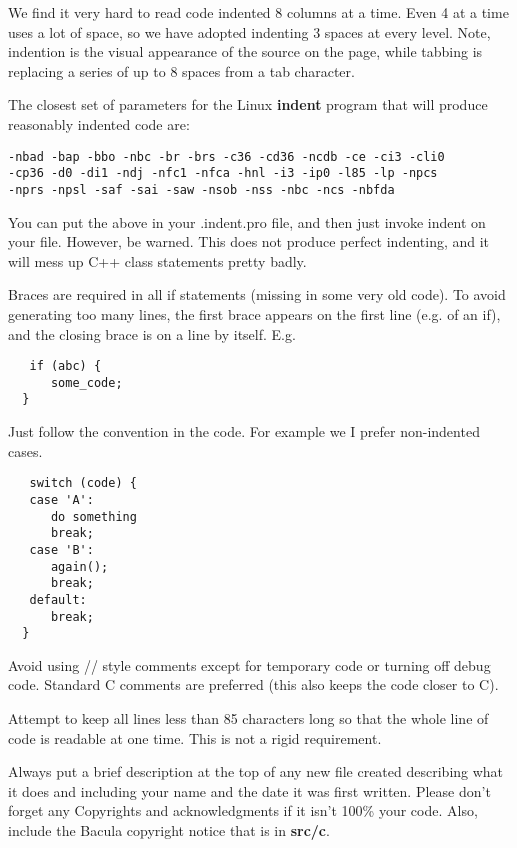 We find it very hard to read code indented 8 columns at a time.
Even 4 at a time uses a lot of space, so we have adopted indenting
3 spaces at every level. Note, indention is the visual appearance of the
source on the page, while tabbing is replacing a series of up to 8 spaces from
a tab character.

The closest set of parameters for the Linux {\bf indent} program that will
produce reasonably indented code are:

\footnotesize
\begin{verbatim}
-nbad -bap -bbo -nbc -br -brs -c36 -cd36 -ncdb -ce -ci3 -cli0
-cp36 -d0 -di1 -ndj -nfc1 -nfca -hnl -i3 -ip0 -l85 -lp -npcs
-nprs -npsl -saf -sai -saw -nsob -nss -nbc -ncs -nbfda
\end{verbatim}
\normalsize

You can put the above in your .indent.pro file, and then just invoke indent on
your file. However, be warned. This does not produce perfect indenting, and it
will mess up C++ class statements pretty badly.

Braces are required in all if statements (missing in some very old code). To
avoid generating too many lines, the first brace appears on the first line
(e.g. of an if), and the closing brace is on a line by itself. E.g.

\footnotesize
\begin{verbatim}
   if (abc) {
      some_code;
  }
\end{verbatim}
\normalsize

Just follow the convention in the code. For example we I prefer non-indented cases.

\footnotesize
\begin{verbatim}
   switch (code) {
   case 'A':
      do something
      break;
   case 'B':
      again();
      break;
   default:
      break;
  }
\end{verbatim}
\normalsize

Avoid using // style comments except for temporary code or turning off debug
code. Standard C comments are preferred (this also keeps the code closer to
C).

Attempt to keep all lines less than 85 characters long so that the whole line
of code is readable at one time. This is not a rigid requirement.

Always put a brief description at the top of any new file created describing
what it does and including your name and the date it was first written. Please
don't forget any Copyrights and acknowledgments if it isn't 100\% your code.
Also, include the Bacula copyright notice that is in {\bf src/c}.

